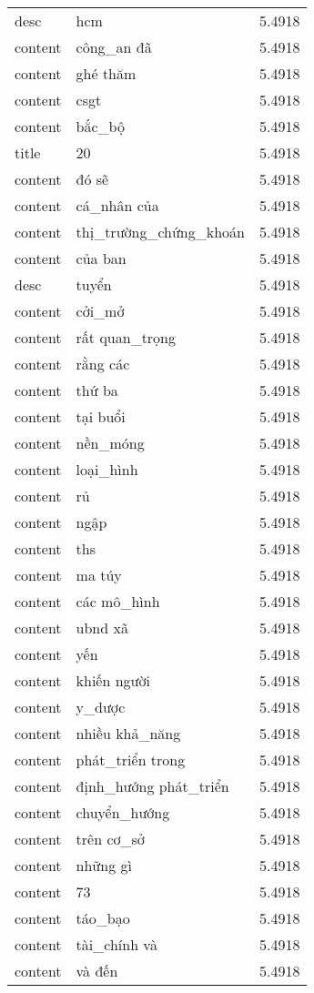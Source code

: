 \documentclass{article}
\begin{document}
\begin{tabular}{lll}
desc & hcm & 5.4918\\
content & công\_an đã & 5.4918\\
content & ghé thăm & 5.4918\\
content & csgt & 5.4918\\
content & bắc\_bộ & 5.4918\\
title & 20 & 5.4918\\
content & đó sẽ & 5.4918\\
content & cá\_nhân của & 5.4918\\
content & thị\_trường\_chứng\_khoán & 5.4918\\
content & của ban & 5.4918\\
desc & tuyển & 5.4918\\
content & cởi\_mở & 5.4918\\
content & rất quan\_trọng & 5.4918\\
content & rằng các & 5.4918\\
content & thứ ba & 5.4918\\
content & tại buổi & 5.4918\\
content & nền\_móng & 5.4918\\
content & loại\_hình & 5.4918\\
content & rủ & 5.4918\\
content & ngập & 5.4918\\
content & ths & 5.4918\\
content & ma túy & 5.4918\\
content & các mô\_hình & 5.4918\\
content & ubnd xã & 5.4918\\
content & yến & 5.4918\\
content & khiến người & 5.4918\\
content & y\_dược & 5.4918\\
content & nhiều khả\_năng & 5.4918\\
content & phát\_triển trong & 5.4918\\
content & định\_hướng phát\_triển & 5.4918\\
content & chuyển\_hướng & 5.4918\\
content & trên cơ\_sở & 5.4918\\
content & những gì & 5.4918\\
content & 73 & 5.4918\\
content & táo\_bạo & 5.4918\\
content & tài\_chính và & 5.4918\\
content & và đến & 5.4918\\

\end{tabular}
\end{document}
